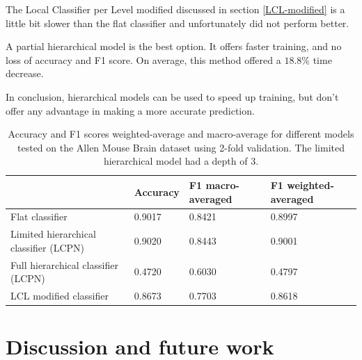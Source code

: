 \documentclass{article}
\begin{document}
The Local Classifier per Level modified discussed in section \ref{LCL-modified} is a little bit slower than the flat classifier and unfortunately did not perform better.

A partial hierarchical model is the best option. It offers faster training, and no loss of accuracy and F1 score.
On average, this method offered a $18.8\%$ time decrease.

In conclusion, hierarchical models can be used to speed up training, but don't offer any advantage in making a more accurate prediction.

\begin{table}[t]
\caption{Accuracy and F1 scores weighted-average and macro-average for different models tested on the Allen Mouse Brain dataset using 2-fold validation. The limited hierarchical model had a depth of 3.}
\label{results}
\vskip 0.15in
\begin{center}
\begin{small}
\begin{sc}
\begin{tabular}{@{}p{27mm}p{14mm}p{14mm}p{14mm}@{}}
\toprule
                                & Accuracy & F1 macro-averaged & F1 weighted-averaged \\ \midrule
Flat classifier\newline                 & 0.9017   & 0.8421            & 0.8997              \\

Limited \newline hierarchical \newline classifier (LCPN)\newline  & 0.9020   & 0.8443            & 0.9001              \\

Full \newline hierarchical \newline classifier (LCPN)\newline     & 0.4720   & 0.6030            & 0.4797               \\
LCL modified \newline classifier & 0.8673 & 0.7703 & 0.8618 \\ \bottomrule
\end{tabular}
\end{sc}
\end{small}
\end{center}
\vskip -0.1in
\end{table}

\section{Discussion and future work}
\end{document}
